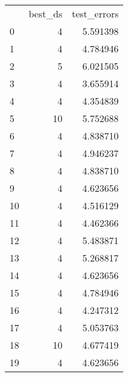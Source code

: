 \begin{tabular}{lrr}
 & best_ds & test_errors \\
0 & 4 & 5.591398 \\
1 & 4 & 4.784946 \\
2 & 5 & 6.021505 \\
3 & 4 & 3.655914 \\
4 & 4 & 4.354839 \\
5 & 10 & 5.752688 \\
6 & 4 & 4.838710 \\
7 & 4 & 4.946237 \\
8 & 4 & 4.838710 \\
9 & 4 & 4.623656 \\
10 & 4 & 4.516129 \\
11 & 4 & 4.462366 \\
12 & 4 & 5.483871 \\
13 & 4 & 5.268817 \\
14 & 4 & 4.623656 \\
15 & 4 & 4.784946 \\
16 & 4 & 4.247312 \\
17 & 4 & 5.053763 \\
18 & 10 & 4.677419 \\
19 & 4 & 4.623656 \\
\end{tabular}
